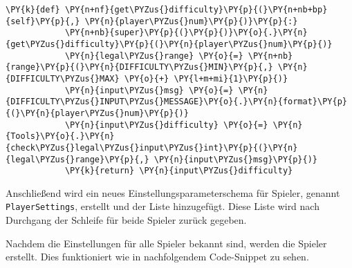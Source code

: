 \begin{Verbatim}[commandchars=\\\{\}]
        \PY{k}{def} \PY{n+nf}{get\PYZus{}difficulty}\PY{p}{(}\PY{n+nb+bp}{self}\PY{p}{,} \PY{n}{player\PYZus{}num}\PY{p}{)}\PY{p}{:}
            \PY{n+nb}{super}\PY{p}{(}\PY{p}{)}\PY{o}{.}\PY{n}{get\PYZus{}difficulty}\PY{p}{(}\PY{n}{player\PYZus{}num}\PY{p}{)}
            \PY{n}{legal\PYZus{}range} \PY{o}{=} \PY{n+nb}{range}\PY{p}{(}\PY{n}{DIFFICULTY\PYZus{}MIN}\PY{p}{,} \PY{n}{DIFFICULTY\PYZus{}MAX} \PY{o}{+} \PY{l+m+mi}{1}\PY{p}{)}
            \PY{n}{input\PYZus{}msg} \PY{o}{=} \PY{n}{DIFFICULTY\PYZus{}INPUT\PYZus{}MESSAGE}\PY{o}{.}\PY{n}{format}\PY{p}{(}\PY{n}{player\PYZus{}num}\PY{p}{)}
            \PY{n}{input\PYZus{}difficulty} \PY{o}{=} \PY{n}{Tools}\PY{o}{.}\PY{n}{check\PYZus{}legal\PYZus{}input\PYZus{}int}\PY{p}{(}\PY{n}{legal\PYZus{}range}\PY{p}{,} \PY{n}{input\PYZus{}msg}\PY{p}{)}
            \PY{k}{return} \PY{n}{input\PYZus{}difficulty}
\end{Verbatim}

    Anschließend wird ein neues Einstellungsparameterschema für Spieler,
genannt \texttt{PlayerSettings}, erstellt und der Liste hinzugefügt.
Diese Liste wird nach Durchgang der Schleife für beide Spieler zurück
gegeben.

Nachdem die Einstellungen für alle Spieler bekannt sind, werden die
Spieler erstellt. Dies funktioniert wie in nachfolgendem Code-Snippet zu
sehen.

